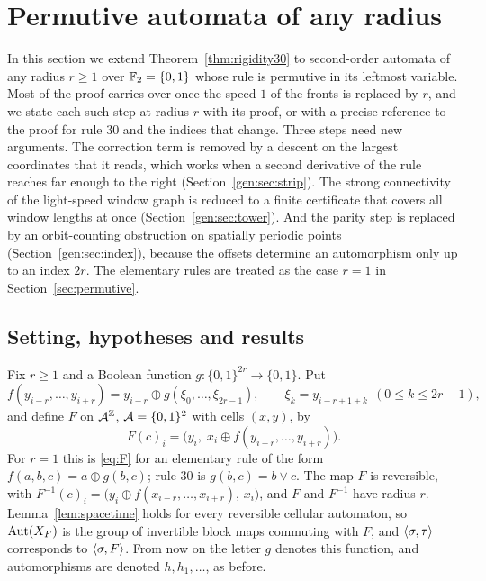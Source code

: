 \section{Permutive automata of any radius}\label{sec:general}

In this section we extend Theorem~\ref{thm:rigidity30} to second-order automata of any radius $r\ge1$ over $\mathbb{F}_2=\{0,1\}$ whose rule is permutive in its leftmost variable. Most of the proof carries over once the speed $1$ of the fronts is replaced by $r$, and we state each such step at radius $r$ with its proof, or with a precise reference to the proof for rule $30$ and the indices that change. Three steps need new arguments. The correction term is removed by a descent on the largest coordinates that it reads, which works when a second derivative of the rule reaches far enough to the right (Section~\ref{gen:sec:strip}). The strong connectivity of the light-speed window graph is reduced to a finite certificate that covers all window lengths at once (Section~\ref{gen:sec:tower}). And the parity step is replaced by an orbit-counting obstruction on spatially periodic points (Section~\ref{gen:sec:index}), because the offsets determine an automorphism only up to an index $2r$. The elementary rules are treated as the case $r=1$ in Section~\ref{sec:permutive}.

\subsection{Setting, hypotheses and results}\label{gen:sec:setting}

Fix $r\ge1$ and a Boolean function $g\colon\{0,1\}^{2r}\to\{0,1\}$. Put
\begin{equation}\label{gen:eq:f}
f(y_{i-r},\dots,y_{i+r})=y_{i-r}\oplus g(\xi_0,\dots,\xi_{2r-1}),\qquad \xi_k=y_{i-r+1+k}\ \ (0\le k\le 2r-1),
\end{equation}
and define $F$ on $\mathcal{A}^{\mathbb{Z}}$, $\mathcal{A}=\{0,1\}^2$ with cells $(x,y)$, by
\begin{equation}\label{gen:eq:F}
F(c)_i=\bigl(y_i,\;x_i\oplus f(y_{i-r},\dots,y_{i+r})\bigr).
\end{equation}
For $r=1$ this is \eqref{eq:F} for an elementary rule of the form $f(a,b,c)=a\oplus g(b,c)$; rule $30$ is $g(b,c)=b\vee c$. The map $F$ is reversible, with $F^{-1}(c)_i=\bigl(y_i\oplus f(x_{i-r},\dots,x_{i+r}),\,x_i\bigr)$, and $F$ and $F^{-1}$ have radius $r$. Lemma~\ref{lem:spacetime} holds for every reversible cellular automaton, so $\operatorname{Aut}(X_F)$ is the group of invertible block maps commuting with $F$, and $\langle\sigma,\tau\rangle$ corresponds to $\langle\sigma,F\rangle$. From now on the letter $g$ denotes this function, and automorphisms are denoted $h,h_1,\dots$, as before.

